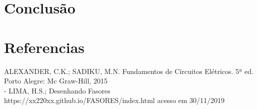 \documentclass[a4paper, 12pt]{article}
\begin{document}
			\newpage
			\section{Conclusão}
		\justifying


		\newpage
		\section*{Referencias}
		\justifying
		\noindent
		ALEXANDER, C.K.; SADIKU, M.N. Fundamentos de Circuitos Elétricos. 5ª ed.
		Porto Alegre: Mc Graw-Hill, 2015\\

		\noindent
		[1] - LIMA, H.S.; Desenhando Fasores https://xx220xx.github.io/FASORES/index.html acesso em 30/11/2019 \\
	
\end{document}
